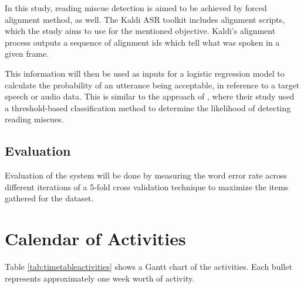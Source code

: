 In this study, reading miscue detection is aimed to be achieved by forced alignment method, as well. The Kaldi ASR toolkit includes alignment scripts, which the study aims to use for the mentioned objective. Kaldi's alignment process outputs a sequence of alignment ids which tell what was spoken in a given frame.

This information will then be used as inputs for a logistic regression model to calculate the probability of an utterance being acceptable, in reference to a target speech or audio data. This is similar to the approach of \citeauthor{pascual-2017} \citeyear{pascual-2017}, where their study used a threshold-based classification method to determine the likelihood of detecting reading miscues.

\subsection{Evaluation}

Evaluation of the system will be done by measuring the word error rate across different iterations of a 5-fold cross validation technique to maximize the items gathered for the dataset.

\section{Calendar of Activities}
%
%
\newcommand{\weekone}{\textbullet}
\newcommand{\weektwo}{\textbullet \textbullet}
\newcommand{\weekthree}{\textbullet \textbullet \textbullet}
\newcommand{\weekfour}{\textbullet \textbullet \textbullet \textbullet}

%
%
\begin{comment}
   \newcommand{\weekone}{$\star$}
   \newcommand{\weektwo}{$\star \star$}
   \newcommand{\weekthree}{$\star \star \star$}
   \newcommand{\weekfour}{$\star \star \star \star$ }
\end{comment}


Table \ref{tab:timetableactivities} shows a Gantt chart of the activities.  Each bullet represents approximately
one week worth of activity.

